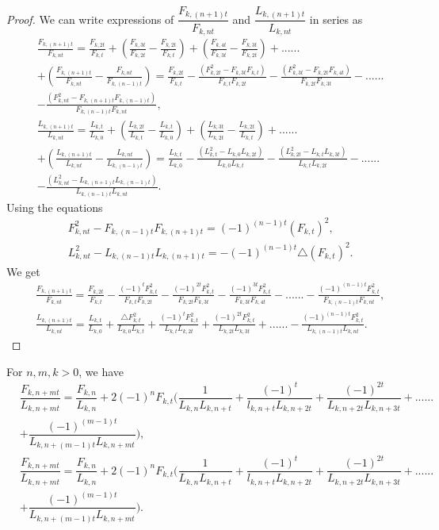  \begin{proof}
 We can write expressions of $\dfrac{F_{k,(n+1)t}}{F_{k,nt}}$ and $\dfrac{L_{k,(n+1)t}}{L_{k,nt}}$ in series as
\begin{align*}
&\frac{F_{k,(n+1)t}}{F_{k,nt}}= \frac{F_{k,2t}}{F_{k,t}} +\left(\frac{F_{k,3t}}{F_{k,2t}}- \frac{F_{k,2t}}{F_{k,t}}\right) + \left(\frac{F_{k,4t}}{F_{k,3t}}- \frac{F_{k,3t}}{F_{k,2t}}\right)+......\\&+\left(\frac{F_{k,(n+1)t}}{F_{k,nt}}- \frac{F_{k,nt}}{F_{k,(n-1)t}}\right)
= \frac{F_{k,2t}}{F_{k,t}} - \frac{( F_{k,2t}^2 - F_{k,3t} F_{k,t})}{F_{k,t} F_{k,2t}} - \frac{( F_{k,3t}^2 - F_{k,2t} F_{k,4t})}{F_{k,2t} F_{k,3t}} - ......\\&- \frac{( F_{k,nt}^2 - F_{k,(n+1)t} F_{k,(n-1)t})}{F_{k,(n-1)t} F_{k,nt}},\\
&\frac{L_{k,(n+1)t}}{L_{k,nt}}= \frac{L_{k,t}}{L_{k,0}} +\left(\frac{L_{k,2t}}{L_{k,t}}- \frac{L_{k,t}}{L_{k,0}}\right) + \left(\frac{L_{k,3t}}{L_{k,2t}}- \frac{L_{k,2t}}{L_{k,t}}\right)+......\\&+\left(\frac{L_{k,(n+1)t}}{L_{k,nt}}- \frac{L_{k,nt}}{L_{k,(n-1)t}}\right)
= \frac{L_{k,t}}{L_{k,0}} - \frac{( L_{k,t}^2 - L_{k,0} L_{k,2t})}{L_{k,0} L_{k,t}} - \frac{( L_{k,2t}^2 - L_{k,t} L_{k,3t})}{L_{k,t} L_{k,2t}} - ......\\&- \frac{( L_{k,nt}^2 - L_{k,(n+1)t} L_{k,(n-1)t})}{L_{k,(n-1)t} L_{k,nt}}.
\end{align*}
Using the equations 
 \begin{align*}
  &F_{k,nt}^2 - F_{k,(n-1)t}F_{k,(n+1)t}=(-1)^{(n-1)t}(F_{k,t})^2,\\
 & L_{k,nt}^2 - L_{k,(n-1)t}L_{k,(n+1)t}=-(-1)^{(n-1)t}\triangle (F_{k,t})^2.
 \end{align*}
We get
\begin{align*}
&\frac{F_{k,(n+1)t}}{F_{k,nt}} = \frac{F_{k,2t}}{F_{k,t}} - \frac{(-1)^t F_{k,t}^2}{F_{k,t}F_{k,2t}}- \frac{(-1)^{2t}F_{k,t}^2}{F_{k,2t}F_{k,3t}}- \frac{(-1)^{3t}F_{k,t}^2}{F_{k,3t}F_{k,4t}} - ......-  \frac{(-1)^{(n-1)t}F_{k,t}^2}{F_{k,(n-1)t}F_{k,nt}},\\
&\frac{L_{k,(n+1)t}}{L_{k,nt}} = \frac{L_{k,t}}{L_{k,0}} +\frac{\triangle F_{k,t}^2}{L_{k,0}L_{k,t}}+ \frac{(-1)^t F_{k,t}^2}{L_{k,t}L_{k,2t}} + \frac{(-1)^{2t}F_{k,t}^2}{L_{k,2t}L_{k,3t}}+......-  \frac{(-1)^{(n-1)t}F_{k,t}^2}{L_{k,(n-1)t}L_{k,nt}}.
 \end{align*}
 \end{proof}
 \begin{theorem} For $ n, m, k > 0$, we have
\begin{align*}
 &\dfrac{F_{k,n+mt}}{L_{k,n+mt}} = \dfrac{F_{k,n}}{L_{k,n}} + 2(-1)^n F_{k,t} ( \dfrac{1}{L_{k,n}L_{k,n+t}} + \dfrac{(-1)^{t}}{l_{k,n+t}L_{k,n+2t}}+ \dfrac{(-1)^{2t}}{L_{k,n+2t}L_{k,n+3t}} + ......\\&+  \dfrac{(-1)^{(m-1)t}}{L_{k,n+(m-1)t}L_{k,n+mt}}),\\
&\dfrac{F_{k,n+mt}}{L_{k,n+mt}} = \dfrac{F_{k,n}}{L_{k,n}} + 2(-1)^n F_{k,t} ( \dfrac{1}{L_{k,n}L_{k,n+t}} + \dfrac{(-1)^{t}}{l_{k,n+t}L_{k,n+2t}}+ \dfrac{(-1)^{2t}}{L_{k,n+2t}L_{k,n+3t}} + ......\\&+  \dfrac{(-1)^{(m-1)t}}{L_{k,n+(m-1)t}L_{k,n+mt}}).
 \end{align*}
 \end{theorem}
